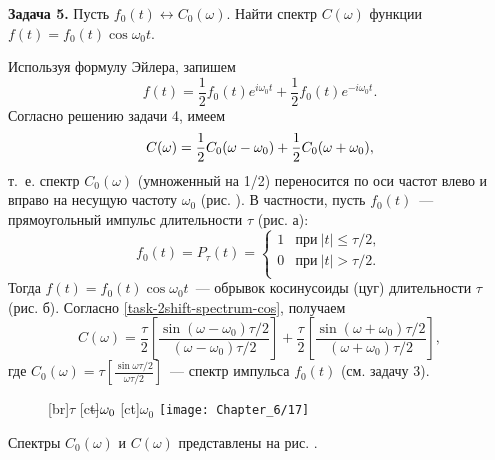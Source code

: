 \textbf{Задача 5.} Пусть $f_0(t)\leftrightarrow C_0(\omega)$. Найти спектр $C(\omega)$ функции $f(t)=f_0(t)\cos\omega_0t$.

Используя формулу Эйлера, запишем
\begin{equation*}
	f(t)=\frac{1}{2}f_0(t)e^{i\omega_0t}+\frac{1}{2}f_0(t)e^{-i\omega_0t}.
\end{equation*}
Согласно решению задачи 4, имеем
\begin{equation}
	\eqmark{task-2shift-spectrum-cos}
	C(\omega)=\frac{1}{2}C_0(\omega-\omega_0)+\frac{1}{2}C_0(\omega+\omega_0),
\end{equation}
т.~е. спектр $C_0(\omega)$ (умноженный на 1/2) переносится по оси частот влево и вправо на несущую частоту $\omega_0$
(рис. ). В частности, пусть $f_0(t)$~--- прямоугольный импульс длительности $\tau$ (рис. а):
\begin{equation*}
	f_0(t)=P_{\tau}(t)=
	\begin{cases}
		1 & \text{при}~|t|\le\tau/2,\\
		0 & \text{при}~|t|>\tau/2.\\
	\end{cases}
\end{equation*}
Тогда $f(t)=f_0(t)\cos\omega_0 t$~--- обрывок косинусоиды (цуг) длительности $\tau$ (рис. б). Согласно \eqref{task-2shift-spectrum-cos},
получаем
\begin{equation*}
	C(\omega)=\frac{\tau}{2}\left[\frac{\sin(\omega-\omega_0)\tau/2}{(\omega-\omega_0)\tau/2}\right]+
\frac{\tau}{2}\left[\frac{\sin(\omega+\omega_0)\tau/2}{(\omega+\omega_0)\tau/2}\right],
\end{equation*}
где $C_0(\omega)=\tau\left[\frac{\sin\omega\tau/2}{\omega\tau/2}\right]$~--- спектр импульса $f_0(t)$ (см. задачу 3).

\begin{figure}
	[br]{$\tau$}
	[ct]{$\llap{$-$}\omega_0$}
	[ct]{$\omega_0$}
	\texttt{[image: Chapter\_6/17]}
	\caption{}
\end{figure}

Спектры $C_0(\omega)$ и $C(\omega)$ представлены на рис. .
